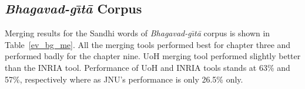 \documentclass[11pt]{article}
\begin{document}



\subsection{\textit{Bhagavad-g\={\i}t\={a}} Corpus}
Merging results for the Sandhi words of \textit{Bhagavad-g\={\i}t\={a}} corpus is shown in Table~\ref{ev_bg_me}. All the merging tools performed best for chapter three and performed badly for the chapter nine. UoH merging tool performed slightly better than the INRIA tool. Performance of UoH and INRIA tools stands at 63\% and 57\%, respectively where as JNU's performance is only 26.5\% only.
\end{document}
